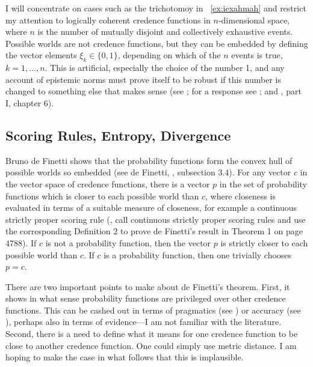 \documentclass[12pt]{article}
\begin{document}

I will concentrate on cases such as the trichotomoy in
{\xample}~\ref{ex:iexahmah} and restrict my attention to logically
coherent credence functions in $n$-dimensional space, where $n$ is the
number of mutually disjoint and collectively exhaustive events.
Possible worlds are not credence functions, but they can be embedded
by defining the vector elements $\xi_{k}\in\{0,1\}$, depending on
which of the $n$ events is true, $k=1,{\ldots},n$. This is artificial,
especially the choice of the number 1, and any account of epistemic
norms must prove itself to be robust if this number is changed to
something else that makes sense (see ; for a
response see ; and , part
I, chapter 6).

\subsection{Scoring Rules, Entropy, Divergence}
\label{subsec:weingoov}

Bruno de Finetti shows that the probability functions form the convex
hull of possible worlds so embedded (see de Finetti,
, subsection 3.4). For any vector $c$ in the
vector space of credence functions, there is a vector $p$ in the set
of probability functions which is closer to each possible world than
$c$, where closeness is evaluated in terms of a suitable measure of
closeness, for example a continuous strictly proper scoring rule
(, call continuous strictly proper
scoring rules  and use the corresponding
Definition 2 to prove de Finetti's result in Theorem 1 on page 4788).
If $c$ is not a probability function, then the vector $p$ is strictly
closer to each possible world than $c$. If $c$ is a probability
function, then one trivially chooses $p=c$.

There are two important points to make about de Finetti's theorem.
First, it shows in what sense probability functions are privileged
over other credence functions. This can be cashed out in terms of
pragmatics (see ) or accuracy (see
), perhaps also in terms of evidence---I am not
familiar with the literature. Second, there is a need to define what
it means for one credence function to be close to another credence
function. One could simply use metric distance. I am hoping to make
the case in what follows that this is implausible.
\end{document}
